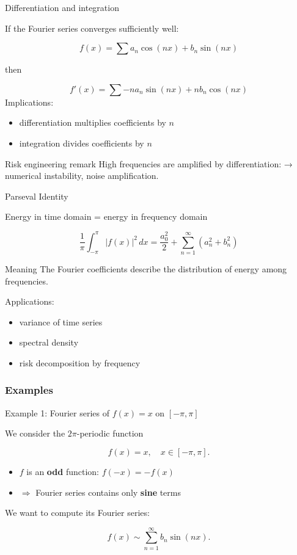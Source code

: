 \documentclass[aspectratio=169]{beamer}
\begin{document}
\begin{frame}{Differentiation and integration}

If the Fourier series converges sufficiently well:

\[
f(x)=\sum a_n\cos(nx)+b_n\sin(nx)
\]

then

\[
f'(x)=\sum -n a_n \sin(nx)+ n b_n \cos(nx)
\]
\pause
Implications:

\begin{itemize}
    \item differentiation multiplies coefficients by \(n\)
    \item integration divides coefficients by \(n\)
\end{itemize}

\begin{block}{Risk engineering remark}
High frequencies are amplified by differentiation:
→ numerical instability, noise amplification.
\end{block}

\end{frame}

\begin{frame}{Parseval Identity}

Energy in time domain = energy in frequency domain

\[
\frac{1}{\pi}\int_{-\pi}^{\pi} |f(x)|^2 \, dx
=
\frac{a_0^2}{2}+\sum_{n=1}^{\infty}(a_n^2+b_n^2)
\]
\pause
\begin{block}{Meaning}
The Fourier coefficients describe the distribution of energy among frequencies.
\end{block}

Applications:

\begin{itemize}
    \item variance of time series
    \item spectral density
    \item risk decomposition by frequency
\end{itemize}

\end{frame}

\subsubsection{Examples}

\begin{frame}{Example 1: Fourier series of $f(x)=x$ on $[-\pi,\pi]$}

We consider the $2\pi$-periodic function

\[
f(x) = x,\quad x \in [-\pi,\pi].
\]
\pause
\begin{itemize}
    \item $f$ is an \textbf{odd} function: $f(-x)=-f(x)$
    \item $\Rightarrow$ Fourier series contains only \textbf{sine} terms
\end{itemize}
\pause
We want to compute its Fourier series:

\[
f(x) \sim \sum_{n=1}^{\infty} b_n \sin(nx).
\]

\end{frame}
\end{document}

